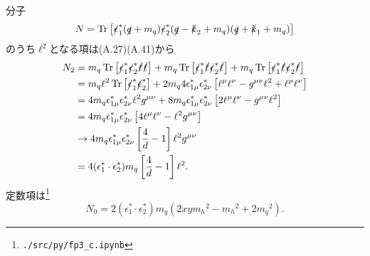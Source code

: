 分子
\[ N = \operatorname{Tr}\left[ \slashed\epsilon_1^\ast (\slashed{q}+m_q) \slashed\epsilon_2^\ast (\slashed{q}-\slashed{k}_2+m_q) (\slashed{q}+\slashed{k}_1+m_q) \right] \]
のうち\(\ell^2\)となる項は(A.27)(A.41)から
\begin{align*}
  N_2 &= m_q \operatorname{Tr}\left[ \slashed\epsilon_1^\ast \slashed\epsilon_2^\ast \slashed\ell \slashed\ell \right]
  + m_q \operatorname{Tr}\left[ \slashed\epsilon_1^\ast \slashed\ell \slashed\epsilon_2^\ast \slashed\ell \right]
  + m_q \operatorname{Tr}\left[ \slashed\epsilon_1^\ast \slashed\ell \slashed\epsilon_2^\ast \slashed\ell \right] \\
  &= m_q \ell^2 \operatorname{Tr}\left[ \slashed\epsilon_1^\ast \slashed\epsilon_2^\ast \right]
  + 2m_q 4 \epsilon_{1\mu}^\ast \epsilon_{2\nu}^\ast \left[ \ell^\mu \ell^\nu - g^{\mu\nu} \ell^2 + \ell^\mu \ell^\nu \right] \\
  &= 4 m_q \epsilon_{1\mu}^\ast \epsilon_{2\nu}^\ast \ell^2 g^{\mu\nu}
  + 8m_q \epsilon_{1\mu}^\ast \epsilon_{2\nu}^\ast \left[ 2\ell^\mu \ell^\nu - g^{\mu\nu} \ell^2 \right] \\
  &= 4m_q \epsilon_{1\mu}^\ast \epsilon_{2\nu}^\ast \left[ 4\ell^\mu \ell^\nu - \ell^2 g^{\mu\nu} \right] \\
  &\to 4m_q \epsilon_{1\mu}^\ast \epsilon_{2\nu}^\ast \left[ \frac{4}{d} - 1 \right] \ell^2 g^{\mu\nu} \\
  &= 4(\epsilon_1^\ast \cdot \epsilon_2^\ast) m_q \left[ \frac{4}{d} - 1 \right] \ell^2 .
\end{align*}
定数項は\footnote{\verb|./src/py/fp3_c.ipynb|}
\[ N_0 = 2(\epsilon_1^\ast \cdot \epsilon_2^\ast) m_q (2xym_h{}^2 - m_h{}^2 + 2m_q{}^2) . \]

